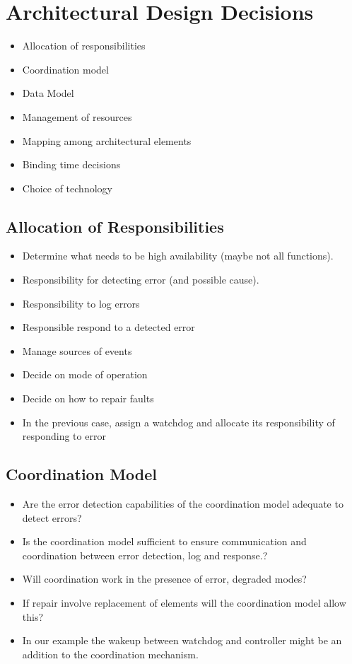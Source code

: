 \documentclass[a4paper]{report}
\begin{document}
\section{Architectural Design Decisions}
\begin{itemize}
\item{Allocation of responsibilities}
\item{Coordination model}
\item{Data Model}
\item{Management of resources}
\item{Mapping among architectural elements}
\item{Binding time decisions}
\item{Choice of technology}
\end{itemize}

\subsection{Allocation of Responsibilities}

\begin{itemize}
\item{Determine what needs to be high availability (maybe not all functions).}
\item{Responsibility for detecting error (and possible cause).}
\item{Responsibility to log errors}
\item{Responsible respond to a detected error}
\item{Manage sources of events}
\item{Decide on mode of operation}
\item{Decide on how to repair faults}
\item{In the previous case, assign a watchdog and allocate its responsibility of responding to error}
\end{itemize}

\subsection{Coordination Model}
\begin{itemize}
\item{Are the error detection capabilities of the coordination model adequate to detect errors?}
\item{Is the coordination model sufficient to ensure communication and coordination between error detection, log and response.?}
\item{Will coordination work in the presence of error, degraded modes?}
\item{If repair involve replacement of elements will the coordination model allow this?}
\item{In our example the wakeup between watchdog and controller might be an addition to the coordination mechanism.}
\end{itemize}
\end{document}
